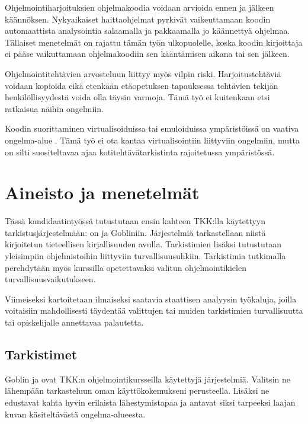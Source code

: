 Ohjelmointiharjoituksien ohjelmakoodia voidaan arvioida ennen ja jälkeen
käännöksen. Nykyaikaiset haittaohjelmat pyrkivät vaikeuttamaan koodin
automaattista analysointia salaamalla ja pakkaamalla jo käännettyä ohjelmaa.
Tällaiset menetelmät on rajattu tämän työn ulkopuolelle, koska koodin
kirjoittaja ei pääse vaikuttamaan ohjelmakoodiin sen kääntämisen aikana tai sen
jälkeen.

Ohjelmointitehtävien arvosteluun liittyy myös vilpin riski. Harjoitustehtäviä
voidaan kopioida eikä etenkään etäopetuksen tapauksessa tehtävien tekijän
henkilöllisyydestä voida olla täysin varmoja. \citep{carter2003shall} Tämä työ
ei kuitenkaan etsi ratkaisua näihin ongelmiin. 

Koodin suorittaminen virtualisoiduissa tai emuloiduissa ympäristöissä on
vaativa ongelma-alue \citep{kesti2010}. Tämä työ ei ota kantaa virtualisointiin
liittyviin ongelmiin, mutta on silti suositeltavaa ajaa kotitehtävätarkistinta
rajoitetussa ympäristössä.


\section{Aineisto ja menetelmät}
\label{sec:aineisto}

Tässä kandidaatintyössä tutustutaan ensin kahteen TKK:lla käytettyyn
tarkistusjärjestelmään: {\scmrobo}on ja Gobliniin. Järjestelmiä tarkastellaan
niistä kirjoitetun tieteellisen kirjallisuuden avulla. Tarkistimien lisäksi
tutustutaan yleisimpiin ohjelmistoihin liittyviin turvallisuusuhkiin.
Tarkistimia tutkimalla perehdytään myös kurssilla opetettavaksi valitun
ohjelmointikielen turvallisuusvaikutukseen.

Viimeiseksi kartoitetaan ilmaiseksi saatavia staattisen
analyysin työkaluja, joilla voitaisiin mahdollisesti täydentää valittujen tai
muiden tarkistimien turvallisuutta tai opiskelijalle annettavaa palautetta.

\subsection{Tarkistimet}

Goblin ja {\scmrobo} ovat TKK:n ohjelmointikursseilla käytettyjä järjestelmiä.
Valitsin ne lähempään tarkasteluun oman käyttökokemukseni
perusteella. Lisäksi ne edustavat kahta hyvin erilaista lähestymistapaa ja
antavat siksi tarpeeksi laajan kuvan käsiteltävästä ongelma-alueesta.


